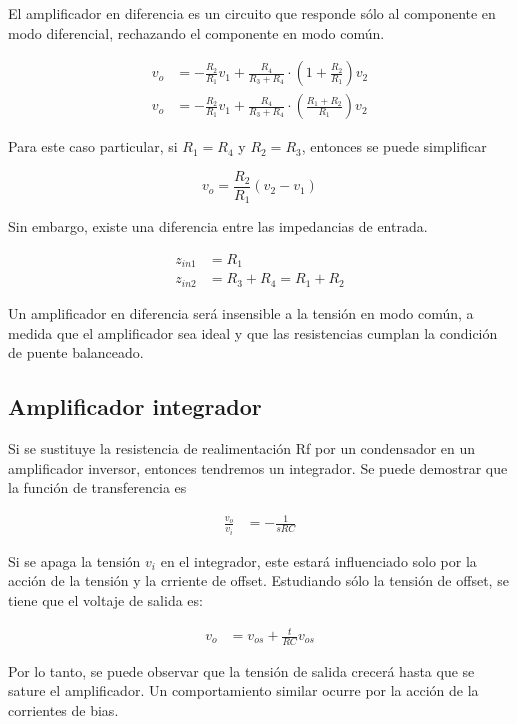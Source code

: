 El amplificador en diferencia es un circuito que responde sólo al componente en modo diferencial, rechazando el componente en modo común.

\begin{align*}
v_o &= -\frac{R_2}{R_1} v_1 + \frac{R_4}{R_3 + R_4} \cdot \left( 1 + \frac{R_2}{R_1} \right) v_2 \\
v_o &= -\frac{R_2}{R_1} v_1 + \frac{R_4}{R_3 + R_4} \cdot \left( \frac{R_1 + R_2}{R_1} \right) v_2
\end{align*}

Para este caso particular, si $R_1 = R_4$ y $R_2 = R_3$, entonces se puede
simplificar

\begin{equation}
    \boxed{v_o = \frac{R_2}{R_1} (v_2 - v_1)}
\end{equation}

Sin embargo, existe una diferencia entre las impedancias de entrada.

\begin{align}
z_{in1} &= R_1 \\
z_{in2} &= R_3 + R_4 = R_1 + R_2
\end{align}


Un amplificador en diferencia será insensible a la tensión en modo común,
a medida que el amplificador sea ideal y que las resistencias cumplan la
condición de puente balanceado.

\subsection{Amplificador integrador}

Si se sustituye la resistencia de realimentación Rf por un condensador en un amplificador inversor, entonces tendremos un integrador. Se puede demostrar que la función de transferencia es

\begin{align*}
\frac{v_o}{v_i} &= -\frac{1}{sRC}
\end{align*}

Si se apaga la tensión $v_i$ en el integrador, este estará influenciado solo por la acción de la tensión y la crriente de offset. Estudiando sólo la tensión de offset, se tiene que el voltaje de salida es:

\begin{align*}
v_o &= v_{os} + \frac{t}{RC} v_{os}
\end{align*}

Por lo tanto, se puede observar que la tensión de salida crecerá hasta que se sature el amplificador. Un comportamiento similar ocurre por la acción de la corrientes de bias.

